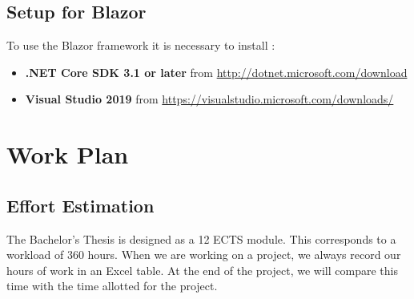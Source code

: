 \documentclass{scrartcl}
\begin{document}





\subsection{Setup for Blazor}
To use the Blazor framework it is necessary to install :\\
\begin{itemize}
\item \textbf{.NET Core SDK 3.1 or later} from \url {http://dotnet.microsoft.com/download}
\item \textbf{Visual Studio 2019} from \url {https://visualstudio.microsoft.com/downloads/}
\end{itemize}








\section{Work Plan}
  		\subsection{Effort Estimation}
  		
  		The Bachelor's Thesis  is designed as a 12 ECTS module. This corresponds to a workload of 360 hours. When we are working on a project, we always record our hours of work in an Excel table.
 At the end of the project, we will compare this time with the time allotted for the project. 		
  		
  		
  		
  		
  		
\end{document}
